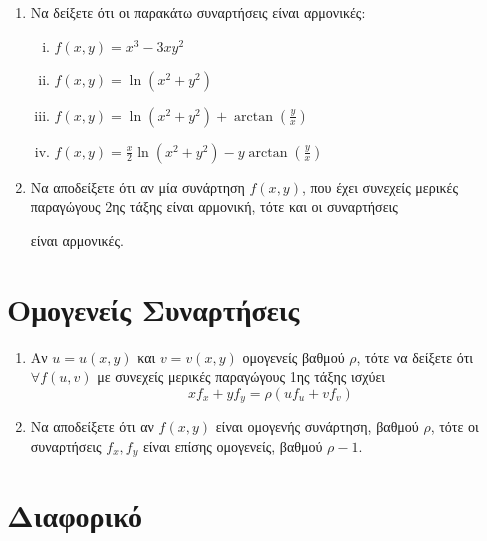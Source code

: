 \begin{enumerate}

  \item Να δείξετε ότι οι παρακάτω συναρτήσεις είναι αρμονικές:
    \begin{enumerate}[(i)]
      \item $ f(x,y) = x^{3}-3xy^{2} $
      \item $ f(x,y) = \ln(x^{2} + y^{2}) $
      \item $ f(x,y) = \ln{(x^{2}+y^{2})} + \arctan(\frac{y}{x}) $
      \item $ f(x,y) = \frac{ x }{ 2 } \ln(x^{2} + y^{2}) - y 
        \arctan(\frac{ y }{ x } ) $
    \end{enumerate}

  \item Να αποδείξετε ότι αν μία συνάρτηση $f(x,y)$, που έχει συνεχείς 
    μερικές παραγώγους 2ης τάξης είναι αρμονική, τότε και οι συναρτήσεις 
    είναι αρμονικές.
\end{enumerate}

\section*{Ομογενείς Συναρτήσεις}

\begin{enumerate}
  \item Αν $ u = u(x,y) $ και $ v=v(x,y) $ ομογενείς βαθμού $ \rho $, 
    τότε να δείξετε ότι $ \forall f(u,v) $ με συνεχείς μερικές παραγώγους 1ης τάξης
    ισχύει 
    \[
      xf_{x}+yf_{y}= \rho (u f_{u}+vf_{v}) 
    \] 
  \item Να αποδείξετε ότι αν $f(x,y)$ είναι ομογενής συνάρτηση, βαθμού $ \rho $, τότε 
    οι συναρτήσεις $ f_{x}, f_{y} $ είναι επίσης ομογενείς, βαθμού $ \rho -1 $.
\end{enumerate}

\section*{Διαφορικό}

